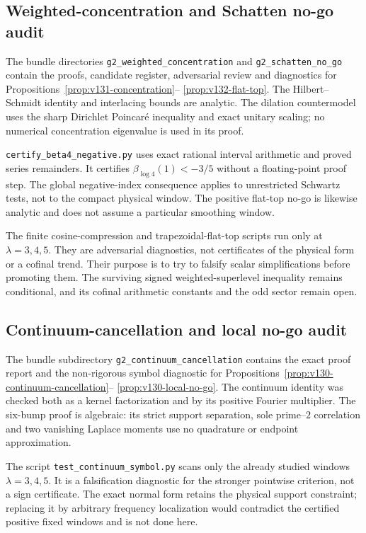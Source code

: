 \documentclass[11pt]{article}
\theoremstyle{remark}
\begin{document}
\subsection*{Weighted-concentration and Schatten no-go audit}
The bundle directories \texttt{g2\_weighted\_concentration} and
\texttt{g2\_schatten\_no\_go} contain the proofs, candidate register,
adversarial review and diagnostics for
Propositions~\ref{prop:v131-concentration}--%
\ref{prop:v132-flat-top}. The Hilbert--Schmidt identity and interlacing
bounds are analytic. The dilation countermodel uses the sharp
Dirichlet Poincar\'e inequality and exact unitary scaling; no numerical
concentration eigenvalue is used in its proof.

\texttt{certify\_beta4\_negative.py} uses exact rational interval
arithmetic and proved series remainders. It certifies
$\beta_{\log4}(1)<-3/5$ without a floating-point proof step. The
global negative-index consequence applies to unrestricted Schwartz
tests, not to the compact physical window. The positive flat-top no-go
is likewise analytic and does not assume a particular smoothing
window.

The finite cosine-compression and trapezoidal-flat-top scripts run only
at $\lambda=3,4,5$. They are adversarial diagnostics, not certificates
of the physical form or a cofinal trend. Their purpose is to try to
falsify scalar simplifications before promoting them. The surviving
signed weighted-superlevel inequality remains conditional, and its
cofinal arithmetic constants and the odd sector remain open.

\subsection*{Continuum-cancellation and local no-go audit}
The bundle subdirectory \texttt{g2\_continuum\_cancellation} contains
the exact proof report and the non-rigorous symbol diagnostic for
Propositions~\ref{prop:v130-continuum-cancellation}--%
\ref{prop:v130-local-no-go}. The continuum identity was checked both
as a kernel factorization and by its positive Fourier multiplier.
The six-bump proof is algebraic: its strict support separation, sole
prime--$2$ correlation and two vanishing Laplace moments use no
quadrature or endpoint approximation.

The script \texttt{test\_continuum\_symbol.py} scans only the already
studied windows $\lambda=3,4,5$. It is a falsification diagnostic for
the stronger pointwise criterion, not a sign certificate. The exact
normal form retains the physical support constraint; replacing it by
arbitrary frequency localization would contradict the certified
positive fixed windows and is not done here.
\end{document}
